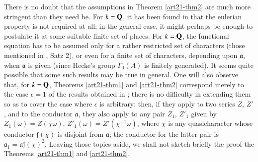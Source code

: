 There is no doubt that the assumptions in Theorem \ref{art21-thm2} are much more stringent than they need be. For $k=\mathbf{Q}$, it has been found in \cite{art21-key2} that the eulerian property is not required at all; in the general case, it might perhaps be enough to postulate it at some suitable finite set of places. For $k=\mathbf{Q}$, the functional equation has to be assumed only for a rather restricted set of characters (those mentioned in \cite{art21-key2}, Satz 2), or even for a finite set of characters, depending upon $\mathfrak{a}$, when $\mathfrak{a}$ is given (since Hecke's group $\Gamma_{0}(A)$ is finitely generated). It seems quite possible that some such results may be true in general. One will also observe that, for $k=\mathbf{Q}$, Theorems \ref{art21-thm1} and \ref{art21-thm2} correspond merely to the case $\epsilon=1$ of the results obtained in \cite{art21-key2}; there is no difficulty in extending them so as to cover the case where $\epsilon$ is arbitrary; then, if they apply to two series $Z$, $Z'$, and to the conductor $\mathfrak{a}$, they also apply to any pair $Z_{1}$, $Z'_{1}$ given by $Z_{1}(\omega)=Z(\chi \omega)$, $Z'_{1}(\omega)=Z'(\chi^{-1}\omega)$, where $\chi$ is any quasicharacter whose conductor $\mathfrak{f}(\chi)$ is disjoint from $\mathfrak{a}$; the conductor for the latter pair is $\mathfrak{a}_{1}=\mathfrak{a}\mathfrak{f}(\chi)^{2}$. Leaving those topics aside, we shall not sketch briefly the proof the Theorems \ref{art21-thm1} and \ref{art21-thm2}.

